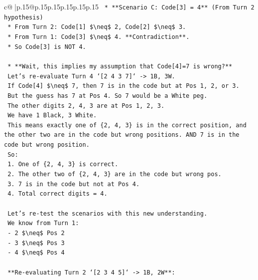 \documentclass{article}
\begin{document}
{\begin{supertabular}{c@{$\;$}|p{.15\linewidth}@{}p{.15\linewidth}p{.15\linewidth}p{.15\linewidth}p{.15\linewidth}p{.15\linewidth}}
{{{\texttt{    *   **Scenario C: Code{[}3{]} = 4** (From Turn 2 hypothesis)} \\
\texttt{        *   From Turn 2: Code{[}1{]} \$\textbackslash{}neq\$ 2, Code{[}2{]} \$\textbackslash{}neq\$ 3.} \\
\texttt{        *   From Turn 1: Code{[}3{]} \$\textbackslash{}neq\$ 4. **Contradiction**.} \\
\texttt{        *   So Code{[}3{]} is NOT 4.} \\
\\ 
\texttt{    *   **Wait, this implies my assumption that Code{[}4{]}=7 is wrong?**} \\
\texttt{        Let's re{-}evaluate Turn 4 `{[}2 4 3 7{]}` {-}> 1B, 3W.} \\
\texttt{        If Code{[}4{]} \$\textbackslash{}neq\$ 7, then 7 is in the code but at Pos 1, 2, or 3.} \\
\texttt{        But the guess has 7 at Pos 4. So 7 would be a White peg.} \\
\texttt{        The other digits 2, 4, 3 are at Pos 1, 2, 3.} \\
\texttt{        We have 1 Black, 3 White.} \\
\texttt{        This means exactly one of \{2, 4, 3\} is in the correct position, and the other two are in the code but wrong positions. AND 7 is in the code but wrong position.} \\
\texttt{        So:} \\
\texttt{        1. One of \{2, 4, 3\} is correct.} \\
\texttt{        2. The other two of \{2, 4, 3\} are in the code but wrong pos.} \\
\texttt{        3. 7 is in the code but not at Pos 4.} \\
\texttt{        4. Total correct digits = 4.} \\
\\ 
\texttt{        Let's re{-}test the scenarios with this new understanding.} \\
\texttt{        We know from Turn 1:} \\
\texttt{        {-} 2 \$\textbackslash{}neq\$ Pos 2} \\
\texttt{        {-} 3 \$\textbackslash{}neq\$ Pos 3} \\
\texttt{        {-} 4 \$\textbackslash{}neq\$ Pos 4} \\
\\ 
\texttt{        **Re{-}evaluating Turn 2 `{[}2 3 4 5{]}` {-}> 1B, 2W**:} \\
}}}
\end{supertabular}}
\end{document}
